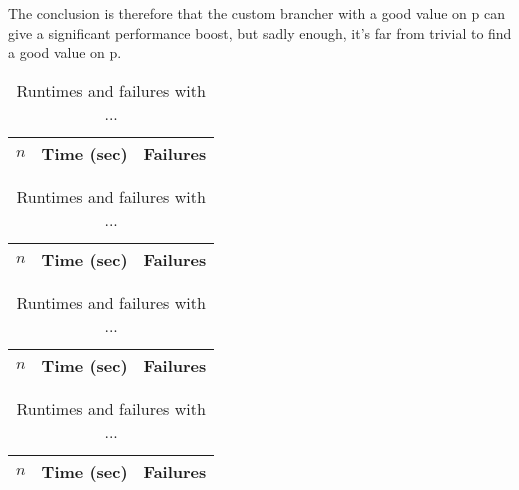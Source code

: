\documentclass[a4paper,11pt]{article}
\begin{document}
The conclusion is therefore that the custom brancher with a good value on p can give a significant performance boost, but sadly enough, it's far from trivial to find a good value on p.


\begin{table}[h]
\centering
\begin{tabular}{r|r|r}
$n$ & Time (sec) & Failures \\
\hline   
\end{tabular}
\caption{Runtimes and failures with ...} 
\end{table}

\begin{table}[h]
\centering
\begin{tabular}{r|r|r}
$n$ & Time (sec) & Failures \\
\hline   
\end{tabular}
\caption{Runtimes and failures with ...} 
\end{table}

\begin{table}[h]
\centering
\begin{tabular}{r|r|r}
$n$ & Time (sec) & Failures \\
\hline   
\end{tabular}
\caption{Runtimes and failures with ...} 
\end{table}

\begin{table}[h]
\centering
\begin{tabular}{r|r|r}
$n$ & Time (sec) & Failures \\
\hline   
\end{tabular}
\caption{Runtimes and failures with ...} 
\end{table}
\end{document}
